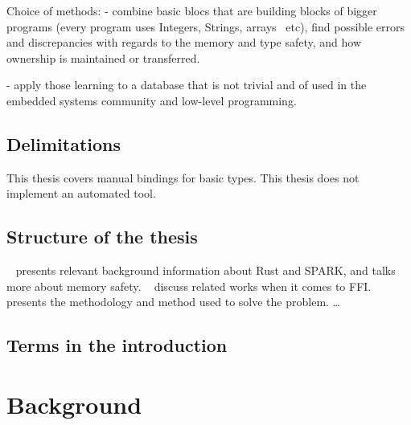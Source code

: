\documentclass[nomenclature, english, bibtex]{kththesis}
\newcommand*{\generalExpl}[1]{\todo[inline]{#1}}
\newcommand*{\sweExpl}[1]{\todo[inline, backgroundcolor=kth-lightblue40]{#1}}  %
\begin{document}
Choice of methods:
- combine basic blocs that are building blocks of bigger programs (every program uses Integers, Strings, arrays \, etc), find possible errors and discrepancies with regards to the memory and type safety, and how ownership is maintained or transferred.

- apply those learning to a database that is not trivial and of used in the embedded systems community and low-level programming.

\section{Delimitations}\sweExpl{Avgränsningar}

This thesis covers manual bindings for basic types. This thesis does not implement an automated tool.

\section{Structure of the thesis}
~ presents relevant background information about Rust and SPARK, and talks more about memory safety.  
~ discuss related works when it comes to \gls{FFI}.   presents the methodology and method used to solve the problem. …

\section{Terms in the introduction}\label{sec:introductiongloss}
\renewcommand{\glossarysection}[2][]{}
\printglossary[type=introductiongloss, style=mydefs, 
]

\cleardoublepage\chapter{Background}
\label{ch:background}
\end{document}
